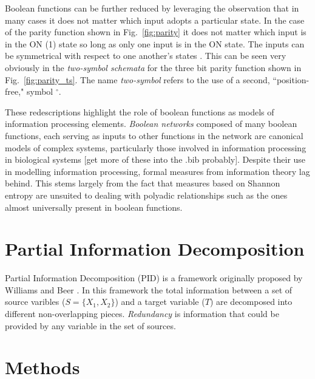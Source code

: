 \documentclass[12pt]{article} %
\newcommand{\figref}[1]{Fig.~\ref{fig:#1}}
\begin{document}
Boolean functions can be further reduced by leveraging the observation that in
many cases it does not matter which input adopts a particular state. In the case
of the parity function shown in \figref{parity} it does not matter which input 
is in the ON (1) state so long as only one input is in the ON state. The inputs 
can be symmetrical with respect to one another's states 
\cite{marques-pita_canalization_2013}. This can be seen very 
obviously in the \textit{two-symbol schemata} for the three bit parity function
shown in \figref{parity_ts}. The name \textit{two-symbol} refers to the use
of a second, ``position-free," symbol $^\circ$.

These redescriptions highlight the role of boolean functions as models of 
information processing elements. \textit{Boolean networks} composed of many
boolean functions, each serving as inputs to other functions in the network are
canonical models of complex systems, particularly those involved in information
processing in biological systems \cite{kauffman_emergent_1984,willadsen_robustness_2007,marques-pita_canalization_2013} 
[get more of these into the .bib probably]. Despite their use in modelling
information processing, formal measures from information theory lag behind. This
stems largely from the fact that measures based on Shannon entropy are unsuited
to dealing with polyadic relationships 
\cite{james_information_2016,james_multivariate_2017} such as the ones almost
universally present in boolean functions. 

\section{Partial Information Decomposition}\label{sec:partial}

Partial Information Decomposition (PID) is a framework originally proposed by
Williams and Beer \cite{williams_nonnegative_2010}. In this framework the
total information between a set of source varibles ($S = \{X_1, X_2\}$) and a 
target variable ($T$) are decomposed into different non-overlapping pieces. 
\textit{Redundancy} is information that could be provided by any variable in 
the set of sources. 

\section{Methods}\label{sec:methods} %


\printbibliography
    
\end{document}
